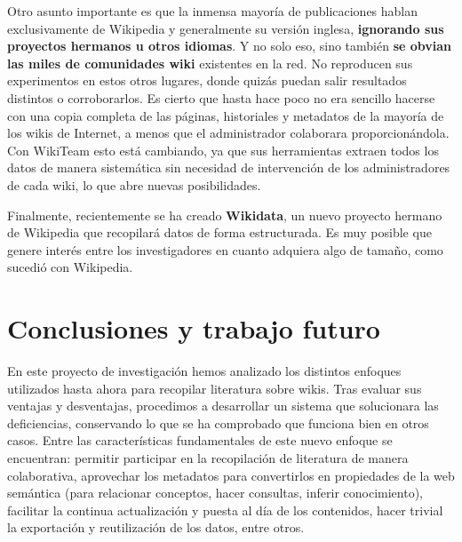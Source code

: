 \documentclass[11pt,onecolumn]{article}
\begin{document}

Otro asunto importante es que la inmensa mayoría de publicaciones hablan exclusivamente de Wikipedia y generalmente su versión inglesa, \textbf{ignorando sus proyectos hermanos u otros idiomas}. Y no solo eso, sino también \textbf{se obvian las miles de comunidades wiki} existentes en la red. No reproducen sus experimentos en estos otros lugares, donde quizás puedan salir resultados distintos o corroborarlos. Es cierto que hasta hace poco no era sencillo hacerse con una copia completa de las páginas, historiales y metadatos de la mayoría de los wikis de Internet, a menos que el administrador colaborara proporcionándola. Con WikiTeam esto está cambiando, ya que sus herramientas extraen todos los datos de manera sistemática sin necesidad de intervención de los administradores de cada wiki, lo que abre nuevas posibilidades.

Finalmente, recientemente se ha creado \textbf{Wikidata}, un nuevo proyecto hermano de Wikipedia que recopilará datos de forma estructurada. Es muy posible que genere interés entre los investigadores en cuanto adquiera algo de tamaño, como sucedió con Wikipedia.

\clearpage

\section{Conclusiones y trabajo futuro}


En este proyecto de investigación hemos analizado los distintos enfoques utilizados hasta ahora para recopilar literatura sobre wikis. Tras evaluar sus ventajas y desventajas, procedimos a desarrollar un sistema que solucionara las deficiencias, conservando lo que se ha comprobado que funciona bien en otros casos. Entre las características fundamentales de este nuevo enfoque se encuentran: permitir participar en la recopilación de literatura de manera colaborativa, aprovechar los metadatos para convertirlos en propiedades de la web semántica (para relacionar conceptos, hacer consultas, inferir conocimiento), facilitar la continua actualización y puesta al día de los contenidos, hacer trivial la exportación y reutilización de los datos, entre otros.
\end{document}
